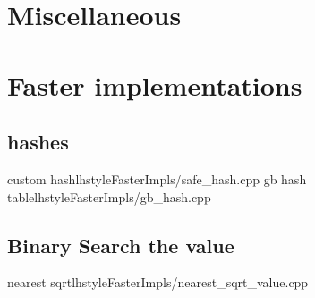 \section{Miscellaneous}
    \section{Faster implementations}
      \subsection{hashes}
         {custom hash}{lhstyle}{FasterImpls/safe_hash.cpp}
         {gb hash table}{lhstyle}{FasterImpls/gb_hash.cpp}
      \subsection{Binary Search the value}
         {nearest sqrt}{lhstyle}{FasterImpls/nearest_sqrt_value.cpp}

